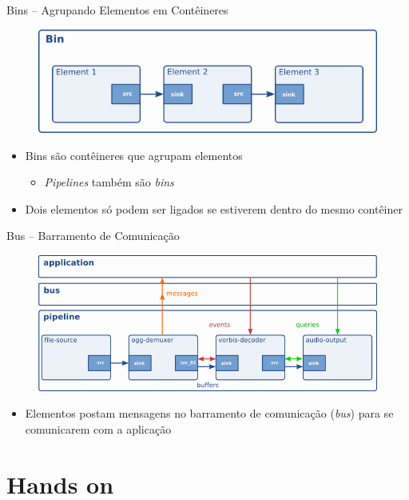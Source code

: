 \documentclass{beamer}
\def\en#1{\foreignlanguage{english}{\emph{#1}}}
\begin{document}
\begin{frame}[c]{Bins -- Agrupando Elementos em Contêineres}
  \begin{figure}
    \centering
    \includegraphics[scale=0.5]{figs/bin}
  \end{figure}

  \begin{itemize}
    \item Bins são contêineres que agrupam elementos
      \begin{itemize}
        \item \en{Pipelines} também são \en{bins}
      \end{itemize}
    \item Dois elementos só podem ser ligados se estiverem dentro do mesmo
      contêiner
  \end{itemize}
\end{frame}

\begin{frame}[c]{Bus -- Barramento de Comunicação}
  \begin{figure}
    \centering
    \includegraphics[scale=0.5]{figs/bus}
  \end{figure}

  \begin{itemize}
    \item Elementos postam mensagens no barramento de comunicação (\en{bus})
      para se comunicarem com a aplicação
  \end{itemize}
\end{frame}

\section{Hands on}
\end{document}
